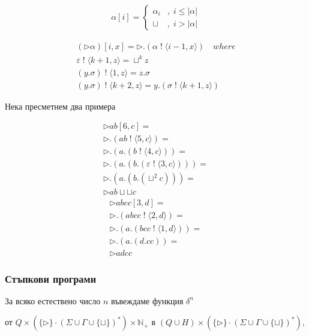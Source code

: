 \documentclass[14pt]{extarticle}
\begin{document}
\begin{align*}
    \alpha[i] = \begin{cases}
        \alpha_i &,\; i \leq |\alpha| \\
        \sqcup &,\; i > |\alpha|
    \end{cases}
\end{align*}

\begin{align*}
    (\triangleright\alpha)[i, x] = \triangleright. (\alpha \;!\; \langle i - 1, x \rangle) \quad where \\
    \varepsilon \;!\; \langle k + 1, z \rangle = \sqcup^{k} z \\
    (y.\sigma) \;!\; \langle 1, z \rangle = z.\sigma \\
    (y.\sigma) \;!\; \langle k + 2, z \rangle = y.(\sigma \;!\; \langle k + 1, z \rangle)
\end{align*}

Нека пресметнем два примера

\begin{align*}
    \triangleright ab [6, c] = \\
    \triangleright . (ab \;!\; \langle 5, c \rangle) = \\
    \triangleright . (a . (b \;!\; \langle 4, c \rangle)) = \\
    \triangleright . (a . (b . (\varepsilon \;!\; \langle 3, c \rangle))) = \\
    \triangleright . (a . (b . (\sqcup^2 c))) = \\
    \triangleright ab \sqcup \sqcup c
\end{align*}
\begin{align*}
    \triangleright abcc [3, d] = \\
    \triangleright . (abcc \;!\; \langle 2, d \rangle) = \\
    \triangleright . (a . (bcc \;!\; \langle 1, d \rangle)) = \\
    \triangleright . (a . (d.cc)) = \\
    \triangleright adcc
\end{align*}

\subsubsection*{Стъпкови програми}

За всяко естествено число \(n\) въвеждаме функция 
\(\delta^n\)

от \(Q \times (\{\triangleright\} \cdot (\Sigma \cup \Gamma \cup \{\sqcup\})^* ) \times \mathbb{N}_+\)
в \((Q \cup H) \times (\{\triangleright\} \cdot (\Sigma \cup \Gamma \cup \{\sqcup\})^* ) \),
\end{document}
